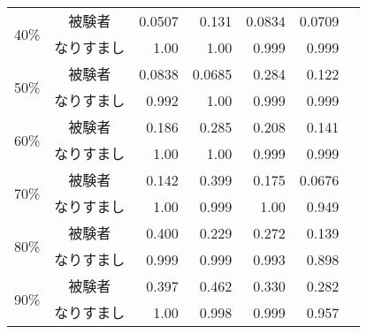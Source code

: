 \begin{center}
\begin{longtable}[btph]{|c|c|r|r|r|r|r|}
      \multirow{2}{*}{40\%} & 被験者 & 0.0507 & 0.131  & 0.0834 & 0.0709 & \\ \cline{2-7}
           & なりすまし & 1.00 & 1.00 & 0.999 & 0.999 & \\ \hline
      \multirow{2}{*}{50\%} & 被験者 & 0.0838 & 0.0685 & 0.284  & 0.122  & \\ \cline{2-7}
           & なりすまし & 0.992 & 1.00 & 0.999 & 0.999 & \\ \hline
      \multirow{2}{*}{60\%} & 被験者 & 0.186  & 0.285  & 0.208  & 0.141  & \\ \cline{2-7}
           & なりすまし & 1.00 & 1.00 & 0.999 & 0.999 & \\ \hline
      \multirow{2}{*}{70\%} & 被験者 & 0.142  & 0.399  & 0.175 & 0.0676 & \\ \cline{2-7}
           & なりすまし & 1.00 & 0.999 & 1.00 & 0.949 & \\ \hline
      \multirow{2}{*}{80\%} & 被験者 & 0.400  & 0.229  & 0.272  & 0.139 & \\ \cline{2-7}
           & なりすまし & 0.999 & 0.999 & 0.993 & 0.898 & \\ \hline
      \multirow{2}{*}{90\%} & 被験者 & 0.397  & 0.462  & 0.330  & 0.282 & \\ \cline{2-7}
           & なりすまし & 1.00 & 0.998 & 0.999 & 0.957 & \\ \hline
  \end{longtable}
\end{center}

